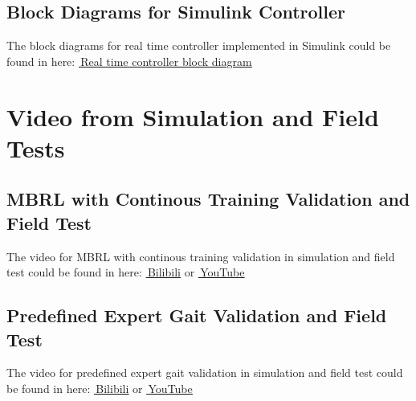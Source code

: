 \subsection*{Block Diagrams for Simulink Controller}
The block diagrams for real time controller implemented in Simulink could be found in here:  \href{https://github.com/n7729697/KTH-MasterThesis/blob/main/img/AppB/controller.pdf}{\faGithub\,\underline{Real time controller block diagram}}

\section{Video from Simulation and Field Tests}
\label{video}
\subsection*{MBRL with Continous Training Validation and Field Test}
The video for MBRL with continous training validation in simulation and field test could be found in here: \href{https://www.bilibili.com/video/BV1aN411E7VF/?share_source=copy_web&vd_source=8c71542a6d6bba72df2db1c453ecb440}{\faBilibili\,\underline{Bilibili}} or \href{https://youtu.be/C9GSnvQT70A}{\faYoutubePlay\,\underline{YouTube}}

\subsection*{Predefined Expert Gait Validation and Field Test}
The video for predefined expert gait validation in simulation and field test could be found in here: \href{https://www.bilibili.com/video/BV15F41127tu/?share_source=copy_web&vd_source=8c71542a6d6bba72df2db1c453ecb440}{\faBilibili\,\underline{Bilibili}} or \href{https://youtu.be/dFp8ss1kfWc}{\faYoutubePlay\,\underline{YouTube}}